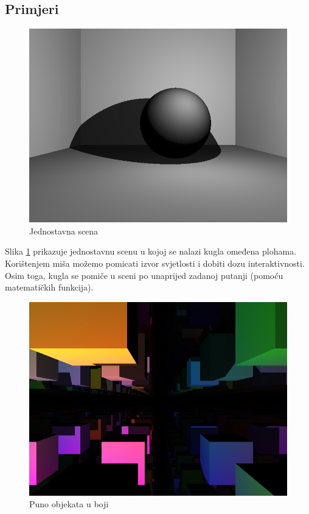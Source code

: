\documentclass[a4paper,12pt]{article}
\begin{document}
\subsection{Primjeri}

\begin{figure}[h]
  \centering
  \includegraphics[width=\textwidth]{screen1.png}
  \caption{Jednostavna scena}
  \label{fig:simple}
\end{figure}

Slika \ref{fig:simple} prikazuje jednostavnu scenu u kojoj se nalazi kugla omeđena plohama.
Korištenjem miša možemo pomicati izvor svjetlosti i dobiti dozu interaktivnosti. Osim toga, kugla
se pomiče u sceni po unaprijed zadanoj putanji (pomoću matematičkih funkcija).

\begin{figure}[h]
  \centering
  \includegraphics[width=\textwidth]{screen2.png}
  \caption{Puno objekata u boji}
  \label{fig:cubes}
\end{figure}
\end{document}
